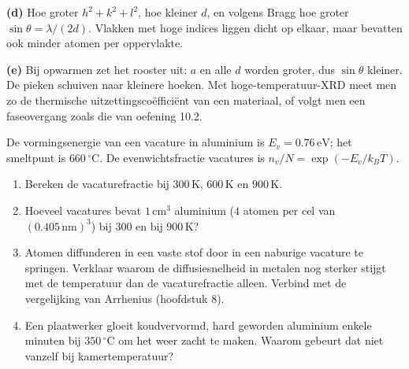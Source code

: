 \begin{oplossing}
\textbf{(d)} Hoe groter \(h^2 + k^2 + l^2\), hoe kleiner \(d\), en volgens Bragg hoe groter \(\sin\theta = \lambda/(2d)\). Vlakken met hoge indices liggen dicht op elkaar, maar bevatten ook minder atomen per oppervlakte.

\textbf{(e)} Bij opwarmen zet het rooster uit: \(a\) en alle \(d\) worden groter, dus \(\sin\theta\) kleiner. De pieken schuiven naar kleinere hoeken. Met hoge-temperatuur-XRD meet men zo de thermische uitzettingscoëfficiënt van een materiaal, of volgt men een faseovergang zoals die van oefening 10.2.
\end{oplossing}

\begin{oefening}
De vormingsenergie van een vacature in aluminium is \(E_v = 0.76\,\mathrm{eV}\); het smeltpunt is \(660\,^\circ\mathrm{C}\). De evenwichtsfractie vacatures is \(n_v/N = \exp(-E_v/k_BT)\).

\begin{enumerate}
\item[(a)]
  Bereken de vacaturefractie bij \(300\,\mathrm{K}\), \(600\,\mathrm{K}\) en \(900\,\mathrm{K}\).
\item[(b)]
  Hoeveel vacatures bevat \(1\,\mathrm{cm^3}\) aluminium (\(4\) atomen per cel van \((0.405\,\mathrm{nm})^3\)) bij \(300\) en bij \(900\,\mathrm{K}\)?
\item[(c)]
  Atomen diffunderen in een vaste stof door in een naburige vacature te springen. Verklaar waarom de diffusiesnelheid in metalen nog sterker stijgt met de temperatuur dan de vacaturefractie alleen. Verbind met de vergelijking van Arrhenius (hoofdstuk 8).
\item[(d)]
  Een plaatwerker gloeit koudvervormd, hard geworden aluminium enkele minuten bij \(350\,^\circ\mathrm{C}\) om het weer zacht te maken. Waarom gebeurt dat niet vanzelf bij kamertemperatuur?
\end{enumerate}
\end{oefening}
